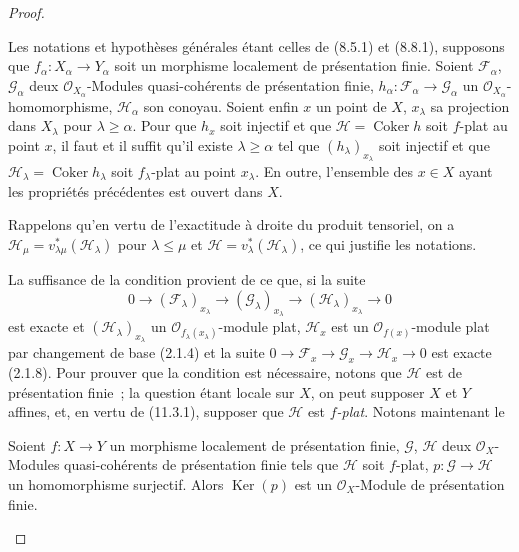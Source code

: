 \begin{proof}
\begin{proposition}[11.3.9]
\label{IV.11.3.9-fr}
Les notations et hypothèses générales étant celles de \textup{(8.5.1)} et \textup{(8.8.1)},
supposons que $f_\alpha:X_\alpha\to Y_\alpha$ soit un morphisme localement de
présentation finie. Soient $\mathcal F_\alpha$, $\mathcal G_\alpha$ deux
$\mathcal O_{X_\alpha}$-Modules quasi-cohérents de présentation finie,
$h_\alpha:\mathcal F_\alpha\to\mathcal G_\alpha$ un
$\mathcal O_{X_\alpha}$-homomorphisme, $\mathcal H_\alpha$ son conoyau. Soient
enfin $x$ un point de $X$, $x_\lambda$ sa projection dans $X_\lambda$ pour
$\lambda\geq\alpha$. Pour que $h_x$ soit injectif et que
$\mathcal H=\operatorname{Coker}h$ soit $f$-plat au point $x$, il faut et il
suffit qu'il existe $\lambda\geq\alpha$ tel que $(h_\lambda)_{x_\lambda}$ soit
injectif et que $\mathcal H_\lambda=\operatorname{Coker}h_\lambda$ soit
$f_\lambda$-plat au point $x_\lambda$. En outre, l'ensemble des $x\in X$ ayant
les propriétés précédentes est ouvert dans $X$.
\end{proposition}

Rappelons qu'en vertu de l'exactitude à droite du produit tensoriel, on a
$\mathcal H_\mu=v_{\lambda\mu}^*(\mathcal H_\lambda)$ pour $\lambda\leq\mu$ et
$\mathcal H=v_\lambda^*(\mathcal H_\lambda)$, ce qui justifie les notations.

La suffisance de la condition provient de ce que, si la suite
\[
0\longrightarrow(\mathcal F_\lambda)_{x_\lambda}
\longrightarrow(\mathcal G_\lambda)_{x_\lambda}
\longrightarrow(\mathcal H_\lambda)_{x_\lambda}\longrightarrow0
\]
est exacte et $(\mathcal H_\lambda)_{x_\lambda}$ un
$\mathcal O_{f_\lambda(x_\lambda)}$-module plat, $\mathcal H_x$ est un
$\mathcal O_{f(x)}$-module plat par changement de base (2.1.4) et la suite
$0\to\mathcal F_x\to\mathcal G_x\to\mathcal H_x\to0$ est exacte (2.1.8).
Pour prouver que
la condition est nécessaire, notons que $\mathcal H$ est de présentation
finie~; la question étant locale sur $X$, on peut supposer $X$ et $Y$ affines,
et, en vertu de (11.3.1), supposer que $\mathcal H$ est \emph{$f$-plat}. Notons
maintenant le

\begin{lemma}[11.3.9.1]
\label{IV.11.3.9.1-fr}
Soient $f:X\to Y$ un morphisme localement de présentation finie,
$\mathcal G$, $\mathcal H$ deux $\mathcal O_X$-Modules quasi-cohérents de
présentation finie tels que $\mathcal H$ soit $f$-plat,
$p:\mathcal G\to\mathcal H$ un homomorphisme surjectif. Alors $\operatorname{Ker}(p)$ est un
$\mathcal O_X$-Module de présentation finie.
\end{lemma}


\end{proof}
